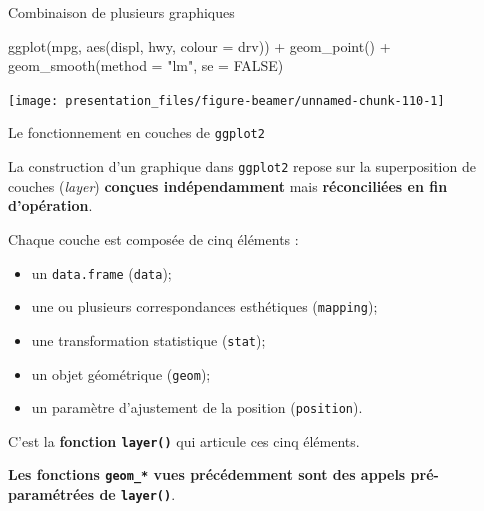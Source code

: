 \documentclass[12pt,ignorenonframetext,handout,]{beamer}
\newenvironment{Shaded}{}{}
\newcommand{\DataTypeTok}[1]{#1}
\newcommand{\KeywordTok}[1]{\textcolor[rgb]{0.00,0.00,1.00}{#1}}
\newcommand{\NormalTok}[1]{#1}
\newcommand{\OperatorTok}[1]{#1}
\newcommand{\OtherTok}[1]{\textcolor[rgb]{1.00,0.25,0.00}{#1}}
\newcommand{\StringTok}[1]{\textcolor[rgb]{0.00,0.50,0.50}{#1}}
\providecommand{\tightlist}{%
  \setlength{\itemsep}{0pt}\setlength{\parskip}{0pt}}
\renewenvironment{Shaded}{\begin{snugshade}}{\end{snugshade}}
\begin{document}
\begin{frame}[fragile]{Combinaison de plusieurs graphiques}
\protect\hypertarget{combinaison-de-plusieurs-graphiques-4}{}

\footnotesize \center

\begin{Shaded}
\begin{Highlighting}[]
\KeywordTok{ggplot}\NormalTok{(mpg, }\KeywordTok{aes}\NormalTok{(displ, hwy, }\DataTypeTok{colour =}\NormalTok{ drv)) }\OperatorTok{+}
\StringTok{  }\KeywordTok{geom_point}\NormalTok{() }\OperatorTok{+}\StringTok{ }\KeywordTok{geom_smooth}\NormalTok{(}\DataTypeTok{method =} \StringTok{"lm"}\NormalTok{, }\DataTypeTok{se =} \OtherTok{FALSE}\NormalTok{)}
\end{Highlighting}
\end{Shaded}

\texttt{[image: presentation\_files/figure-beamer/unnamed-chunk-110-1]}

\end{frame}

\begin{frame}[fragile]{\large Le fonctionnement en \og couches \fg{} de
\texttt{ggplot2}}
\protect\hypertarget{le-fonctionnement-en-couches-de-ggplot2}{}

La construction d’un graphique dans \texttt{ggplot2} repose sur la
superposition de couches (\emph{layer}) \textbf{conçues indépendamment}
mais \textbf{réconciliées en fin d’opération}.

\pause Chaque couche est composée de cinq éléments :

\begin{itemize}
\tightlist
\item
  un \texttt{data.frame} (\texttt{data});
\item
  une ou plusieurs correspondances esthétiques (\texttt{mapping});
\item
  une transformation statistique (\texttt{stat});
\item
  un objet géométrique (\texttt{geom});
\item
  un paramètre d’ajustement de la position (\texttt{position}).
\end{itemize}

C’est la \textbf{fonction \texttt{layer()}} qui articule ces cinq
éléments.

\pause

\textbf{Les fonctions \texttt{geom\_*} vues précédemment sont des appels
pré-paramétrées de \texttt{layer()}}.

\end{frame}
\end{document}
